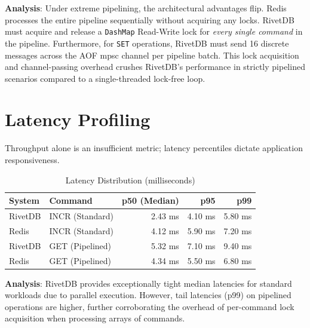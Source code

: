 \textbf{Analysis}: Under extreme pipelining, the architectural advantages flip. Redis processes the entire pipeline sequentially without acquiring any locks. RivetDB must acquire and release a \texttt{DashMap} Read-Write lock for \textit{every single command} in the pipeline. Furthermore, for \texttt{SET} operations, RivetDB must send 16 discrete messages across the AOF mpsc channel per pipeline batch. This lock acquisition and channel-passing overhead crushes RivetDB's performance in strictly pipelined scenarios compared to a single-threaded lock-free loop.

\section{Latency Profiling}

Throughput alone is an insufficient metric; latency percentiles dictate application responsiveness.

\begin{table}[htbp]
\caption{Latency Distribution (milliseconds)}
\label{tab:latency_dist}
\centering
\renewcommand{\arraystretch}{1.5}
\begin{tabular}{@{}llrrr@{}}
\toprule
\textbf{System} & \textbf{Command} & \textbf{p50 (Median)} & \textbf{p95} & \textbf{p99} \\
\midrule
RivetDB & INCR (Standard) & 2.43 ms & 4.10 ms & 5.80 ms \\
Redis & INCR (Standard) & 4.12 ms & 5.90 ms & 7.20 ms \\
\midrule
RivetDB & GET (Pipelined) & 5.32 ms & 7.10 ms & 9.40 ms \\
Redis & GET (Pipelined) & 4.34 ms & 5.50 ms & 6.80 ms \\
\bottomrule
\end{tabular}
\end{table}

\textbf{Analysis}: RivetDB provides exceptionally tight median latencies for standard workloads due to parallel execution. However, tail latencies (p99) on pipelined operations are higher, further corroborating the overhead of per-command lock acquisition when processing arrays of commands.

